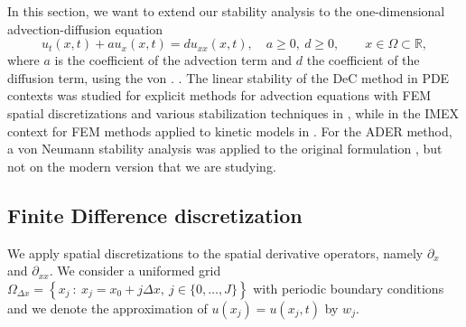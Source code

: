 In this section, we want to extend our stability analysis to the one-dimensional advection-diffusion equation
\begin{equation}\label{eq: A-D_equation}
u_t(x,t) + au_x(x,t) = du_{xx}(x,t), \quad a\ge0, \ d \ge 0, \qquad x \in \Omega \subset \mathbb R,
\end{equation}
where $a$ is the coefficient of the advection term and $d$ the coefficient of the diffusion term, using the von  . %
.
The linear stability of the DeC method in PDE contexts was studied for explicit methods for advection equations with FEM spatial discretizations and various stabilization techniques in \cite{michel2021spectral,michel2023spectral}, while in the IMEX context for FEM methods applied to kinetic models in \cite{torlo2020hyperbolic}.
For the ADER method, a von Neumann stability analysis was applied to the original formulation \cite{titarev2007analysis,dematte2020ader}, but not on the modern version that we are studying. 
\subsection{Finite Difference discretization}
\label{sec: spatial_discretization}
We apply spatial discretizations to the spatial derivative operators, namely $\partial_x$ and $\partial_{xx}$. 
We consider a uniformed grid $\Omega_{\Delta x}=\left\{x_j \ : \ x_j = x_0 + j\Delta x, \ j \in \{0,\hdots , J\}\right\}$ with periodic boundary conditions and we denote the approximation of $u(x_j)=u(x_j,t)$ by $w_j$.

